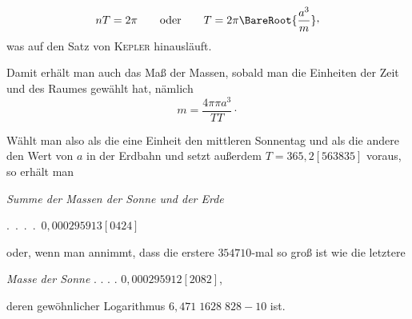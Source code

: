 \[
nT=2\pi\qquad\text{oder}\qquad T=2\pi\BareRoot{\frac{a^3}{m}}\mathpunct{\raisebox{.45ex}{,}}
\]
was auf den Satz von \textsc{Kepler} hinausläuft.
\par Damit erhält man auch das Maß der Massen, sobald man die Einheiten der Zeit und des Raumes gewählt hat, nämlich
\[
m=\frac{4\pi\pi a^3}{TT}\mathpunct{\cdot}
\]
\par Wählt man also als die eine Einheit den mittleren Sonnentag und als die andere den Wert von \(a\) in der Erdbahn und setzt außerdem \(T=365{,}2[563835]\) voraus, so erhält man
\begin{center}
\textit{Summe der Massen der Sonne und der Erde}\par\nobreak
\mbox{. . . . \(0{,}000295913[0424]\)}
\end{center}
oder, wenn man annimmt, dass die erstere \(354710\)-mal so groß ist wie die letztere
\begin{center}
\textit{Masse der Sonne} . . . . \(0{,}000295912[2082]\),
\end{center}
deren gewöhnlicher Logarithmus \(6{,}471\;1628\;828-10\) ist.
